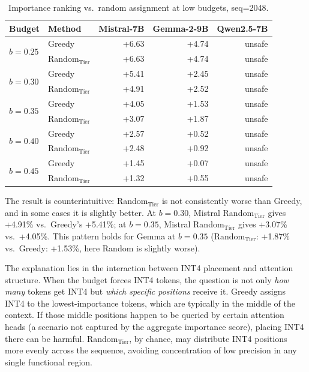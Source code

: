 \documentclass[11pt]{article}
\newcommand{\budget}{b}
\newcommand{\pct}{\%}
\theoremstyle{plain}
\theoremstyle{definition}
\begin{document}
\begin{table}[t]
\centering
\caption{Importance ranking vs.\ random assignment at low budgets, seq=2048.}
\label{tab:ablation-ranking}
\small
\begin{tabular}{llrrr}
\toprule
Budget & Method & Mistral-7B & Gemma-2-9B & Qwen2.5-7B \\
\midrule
\multirow{2}{*}{$\budget=0.25$}
  & Greedy & +6.63 & +4.74 & unsafe \\
  & Random$_{\text{Tier}}$ & +6.63 & +4.74 & unsafe \\
\midrule
\multirow{2}{*}{$\budget=0.30$}
  & Greedy & +5.41 & +2.45 & unsafe \\
  & Random$_{\text{Tier}}$ & +4.91 & +2.52 & unsafe \\
\midrule
\multirow{2}{*}{$\budget=0.35$}
  & Greedy & +4.05 & +1.53 & unsafe \\
  & Random$_{\text{Tier}}$ & +3.07 & +1.87 & unsafe \\
\midrule
\multirow{2}{*}{$\budget=0.40$}
  & Greedy & +2.57 & +0.52 & unsafe \\
  & Random$_{\text{Tier}}$ & +2.48 & +0.92 & unsafe \\
\midrule
\multirow{2}{*}{$\budget=0.45$}
  & Greedy & +1.45 & +0.07 & unsafe \\
  & Random$_{\text{Tier}}$ & +1.32 & +0.55 & unsafe \\
\bottomrule
\end{tabular}
\end{table}

The result is counterintuitive: Random$_{\text{Tier}}$ is not consistently worse than Greedy, and in some cases it is slightly better.  At $\budget=0.30$, Mistral Random$_{\text{Tier}}$ gives +4.91\pct{} vs.\ Greedy's +5.41\pct{}; at $\budget=0.35$, Mistral Random$_{\text{Tier}}$ gives +3.07\pct{} vs.\ +4.05\pct{}.  This pattern holds for Gemma at $\budget=0.35$ (Random$_{\text{Tier}}$: +1.87\pct{} vs.\ Greedy: +1.53\pct{}, here Random is slightly worse).

The explanation lies in the interaction between INT4 placement and attention structure.  When the budget forces INT4 tokens, the question is not only \emph{how many} tokens get INT4 but \emph{which specific positions} receive it.  Greedy assigns INT4 to the lowest-importance tokens, which are typically in the middle of the context.  If those middle positions happen to be queried by certain attention heads (a scenario not captured by the aggregate importance score), placing INT4 there can be harmful.  Random$_{\text{Tier}}$, by chance, may distribute INT4 positions more evenly across the sequence, avoiding concentration of low precision in any single functional region.
\end{document}
